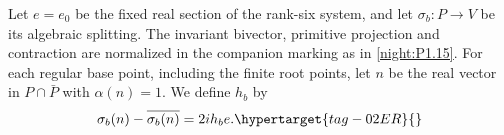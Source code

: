 \begin{definition}
\label{def:hb}
Let $e=e_0$ be the fixed real section of the rank-six system,
and let $\sigma_b:P\to V$ be its algebraic splitting.
The invariant bivector, primitive projection and contraction are
normalized in the companion marking as in \cref{night:P1.15}.
For each regular base point, including the finite root points,
let $n$ be the real vector in $P\cap\bar P$ with $\alpha(n)=1$.
We define $h_b$ by
\begin{equation}
 \sigma_b(n)-\overline{\sigma_b(n)}=2i h_b e.
 \hypertarget{tag-02ER}{}\label{maps:eq:F.20}
\end{equation}
\end{definition}
